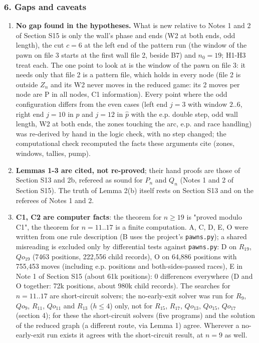 \subsubsection*{6. Gaps and caveats}
\begin{enumerate}
\item \textbf{No gap found in the hypotheses.} What is new relative to Notes 1 and 2 of Section S15 is only the wall's phase and ends (W2 at both ends, odd length), the cut $c=6$ at the left end of the pattern run (the window of the pawn on file 3 starts at the first wall file 2, beside B7) and $n_0=19$; H1-H3 treat each. The one point to look at is the window of the pawn on file 3: it needs only that file 2 is a pattern file, which holds in every node (file 2 is outside $Z_n$ and its W2 never moves in the reduced game: its 2 moves per node are P in all nodes, C1 information). Every point where the odd configuration differs from the even cases (left end $j=3$ with window $2..6$, right end $j=10$ in $p$ and $j=12$ in $\hat p$ with the e.p. double step, odd wall length, W2 at both ends, the zones touching the arc, e.p. and race handling) was re-derived by hand in the logic check, with no step changed; the computational check recomputed the facts these arguments cite (zones, windows, tallies, pump).
\item \textbf{Lemmas 1-3 are cited, not re-proved}; their hand proofs are those of Section S13 and 2b, refereed as sound for $P_n$ and $Q_n$ (Notes 1 and 2 of Section S15). The truth of Lemma 2(b) itself rests on Section S13 and on the referees of Notes 1 and 2.
\item \textbf{C1, C2 are computer facts}: the theorem for $n\ge19$ is "proved modulo C1", the theorem for $n=11..17$ is a finite computation. A, C, D, E, O were written from one rule description (B uses the project's \texttt{pawns.py}); a shared misreading is excluded only by differential tests against \texttt{pawns.py}: D on $R_{19}$, $Qo_{19}$ (7463 positions, 222,556 child records), O on 64,886 positions with 755,453 moves (including e.p. positions and both-sides-passed races), E in Note 1 of Section S15 (about 61k positions): 0 differences everywhere (D and O together: 72k positions, about 980k child records). The searches for $n=11..17$ are short-circuit solvers; the no-early-exit solver was run for $R_9$, $Qo_9$, $R_{11}$, $Qo_{11}$ and $R_{13}$ ($h\le4$) only, not for $R_{15}$, $R_{17}$, $Qo_{13}$, $Qo_{15}$, $Qo_{17}$ (section 4); for these the short-circuit solvers (five programs) and the solution of the reduced graph (a different route, via Lemma 1) agree. Wherever a no-early-exit run exists it agrees with the short-circuit result, at $n=9$ as well.

\end{enumerate}
